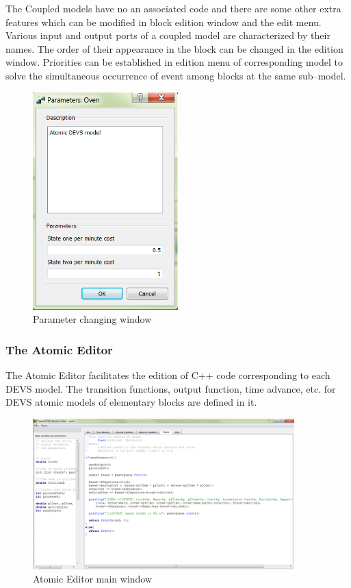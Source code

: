 \documentclass[titlepage]{article}%
\begin{document}
The Coupled models have no an associated code and there are some other extra features which can be modified in block edition window and the edit menu. Various input and output ports of a coupled model are characterized by their names. The order of their appearance in the block can be changed in the edition window. Priorities can be established in edition menu of corresponding model to solve the simultaneous occurrence of event among blocks at the same sub–model.

\begin{figure}[h!]
  \centering
    \includegraphics[width=0.5\textwidth]{Fig5.png}
    \caption{Parameter changing window}
    \label{para_win}
\end{figure}


\subsubsection{The Atomic Editor}
The Atomic Editor facilitates the edition of C++ code corresponding to each DEVS model. The transition functions, output function, time advance, etc. for DEVS atomic models of elementary blocks are defined in it.


\begin{figure}[h!]
  \centering
    \includegraphics[width=0.9\textwidth]{Fig6.png}
    \caption{Atomic Editor main window}
    \label{atomic_win}
\end{figure}
\end{document}
